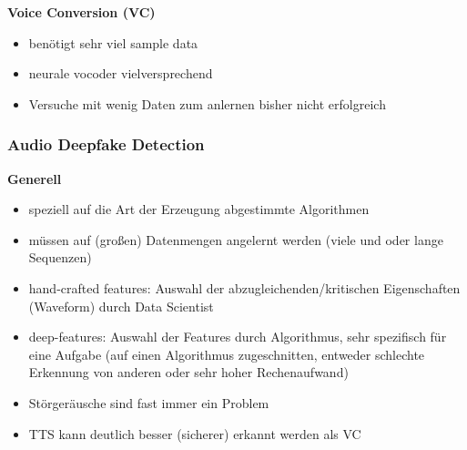 \textbf{Voice Conversion (VC)}
\begin{itemize}
  \item benötigt sehr viel sample data
  \item neurale vocoder vielversprechend
  \item Versuche mit wenig Daten zum anlernen bisher nicht erfolgreich
\end{itemize}

\subsubsection{Audio Deepfake Detection}
\textbf{Generell}
\begin{itemize}
  \item speziell auf die Art der Erzeugung abgestimmte Algorithmen
  \item müssen auf (großen) Datenmengen angelernt werden (viele und oder lange Sequenzen)
  \item hand-crafted features: Auswahl der abzugleichenden/kritischen Eigenschaften (Waveform) durch Data Scientist
  \item deep-features: Auswahl der Features durch Algorithmus, sehr spezifisch für eine Aufgabe (auf einen Algorithmus zugeschnitten, entweder schlechte Erkennung von anderen oder sehr hoher Rechenaufwand)
  \item Störgeräusche sind fast immer ein Problem
  \item TTS kann deutlich besser (sicherer) erkannt werden als VC
\end{itemize}

